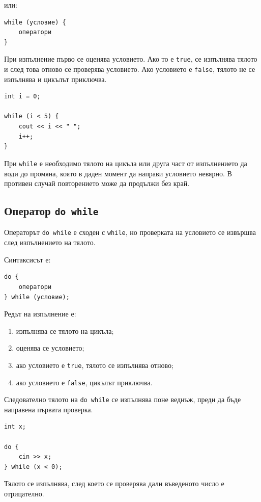 или:

\begin{verbatim}
while (условие) {
    оператори
}
\end{verbatim}

При изпълнение първо се оценява условието. Ако то е \texttt{true}, се изпълнява тялото и след това отново се проверява условието. Ако условието е \texttt{false}, тялото не се изпълнява и цикълът приключва.

\begin{example}
\begin{verbatim}
int i = 0;

while (i < 5) {
    cout << i << " ";
    i++;
}
\end{verbatim}
\end{example}

При \texttt{while} е необходимо тялото на цикъла или друга част от изпълнението да води до промяна, която в даден момент да направи условието невярно. В противен случай повторението може да продължи без край.

\subsection{Оператор \texttt{do while}}\label{s:14.4.3}

Операторът \texttt{do while} е сходен с \texttt{while}, но проверката на условието се извършва след изпълнението на тялото.

Синтаксисът е:

\begin{verbatim}
do {
    оператори
} while (условие);
\end{verbatim}

Редът на изпълнение е:

\begin{enumerate}
\item изпълнява се тялото на цикъла;
\item оценява се условието;
\item ако условието е \texttt{true}, тялото се изпълнява отново;
\item ако условието е \texttt{false}, цикълът приключва.
\end{enumerate}

Следователно тялото на \texttt{do while} се изпълнява поне веднъж, преди да бъде направена първата проверка.

\begin{example}
\begin{verbatim}
int x;

do {
    cin >> x;
} while (x < 0);
\end{verbatim}

Тялото се изпълнява, след което се проверява дали въведеното число е отрицателно.
\end{example}

